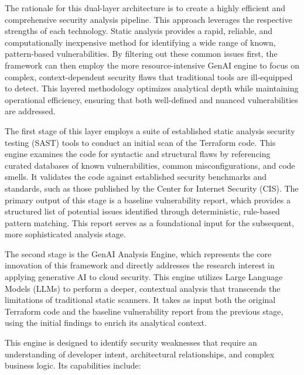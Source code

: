 The rationale for this dual-layer architecture is to create a highly efficient and comprehensive security analysis pipeline. This approach leverages the respective strengths of each technology. Static analysis provides a rapid, reliable, and computationally inexpensive method for identifying a wide range of known, pattern-based vulnerabilities. By filtering out these common issues first, the framework can then employ the more resource-intensive GenAI engine to focus on complex, context-dependent security flaws that traditional tools are ill-equipped to detect. This layered methodology optimizes analytical depth while maintaining operational efficiency, ensuring that both well-defined and nuanced vulnerabilities are addressed.

The first stage of this layer employs a suite of established static analysis security testing (SAST) tools to conduct an initial scan of the Terraform code. This engine examines the code for syntactic and structural flaws by referencing curated databases of known vulnerabilities, common misconfigurations, and code smells. It validates the code against established security benchmarks and standards, such as those published by the Center for Internet Security (CIS). The primary output of this stage is a baseline vulnerability report, which provides a structured list of potential issues identified through deterministic, rule-based pattern matching. This report serves as a foundational input for the subsequent, more sophisticated analysis stage.

The second stage is the GenAI Analysis Engine, which represents the core innovation of this framework and directly addresses the research interest in applying generative AI to cloud security. This engine utilizes Large Language Models (LLMs) to perform a deeper, contextual analysis that transcends the limitations of traditional static scanners\cite{hayagreevan_security_2024, ling_enhancing_2024}. It takes as input both the original Terraform code and the baseline vulnerability report from the previous stage, using the initial findings to enrich its analytical context.


This engine is designed to identify security weaknesses that require an understanding of developer intent, architectural relationships, and complex business logic\cite{noseevich_towards_2015}. Its capabilities include:

